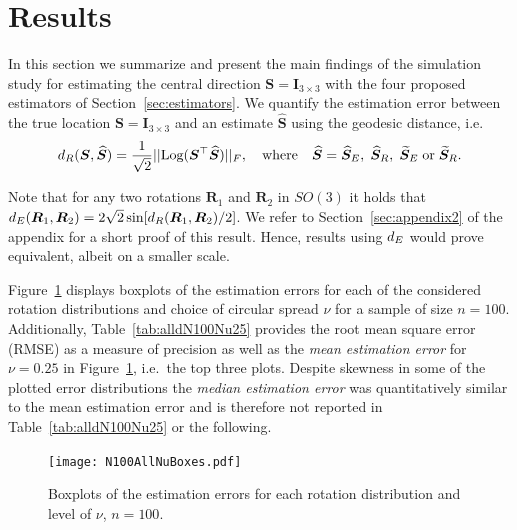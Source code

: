 \section{Results}\label{sec:results}

In this section we summarize and present the main findings of the simulation study for  estimating the central direction $\bm S = \bm I_{3\times 3}$ with the four proposed estimators of Section~\ref{sec:estimators}. We quantify the estimation error between the true location $\bm S = \bm I_{3\times 3}$ and an estimate $\widehat{\bm S}$ using the geodesic distance, i.e.  
\begin{equation}
{d_R}(\bm{S}, \widehat{\bm{S}}) =  \frac{1}{\sqrt{2}}||
\text{Log}(\bm{S}^\top\widehat{\bm{S}})||_F, \quad \mbox{where} \quad \widehat{\bm{S}} =  {\widehat{\bm S}_E}, \; {\widehat{\bm S}_R},\;  {\widetilde{\bm S}_E} \; \mbox{or} \; {\widetilde{\bm S}_R}.
\end{equation}

\noindent Note that for any two rotations $\bm R_1$ and $\bm R_2$ in $SO(3)$ it holds that ${d_E}(\bm R_1,\bm R_2)=2\sqrt{2}\sin[{d_R}(\bm R_1,\bm R_2)/2]$. We refer to Section~\ref{sec:appendix2} of the appendix for a short proof of this result.  Hence, results using ${d_E}$ would prove equivalent, albeit on a smaller scale.   

Figure~\ref{fig:NuBoxes} displays boxplots of the estimation errors for each of the considered rotation distributions and choice of circular spread $\nu$ for a sample of size  $n=100$.  Additionally,  Table~\ref{tab:alldN100Nu25} provides the root mean square error (RMSE) as a measure of precision as well as the \textit{mean estimation error} for $\nu=0.25$ in Figure~\ref{fig:NuBoxes}, i.e.~the top three plots. Despite skewness in some of the plotted error distributions the \textit{median estimation error} was quantitatively similar to the mean estimation error and is therefore not reported in Table~\ref{tab:alldN100Nu25} or the following.
\begin{center}
\begin{figure}[h!]
\texttt{[image: N100AllNuBoxes.pdf]}
\caption{Boxplots of the estimation errors for each rotation distribution and level of $\nu$,  $n=100$.}
\label{fig:NuBoxes}
\end{figure}
\end{center}


